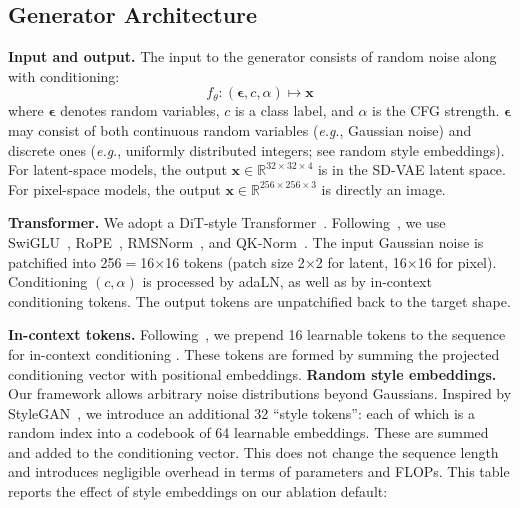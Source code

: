 \documentclass{article}
\newcommand{\vv}[1]{\mathbf{#1}}
\newcommand{\x}{\vv{x}}
\newcommand{\e}{{\boldsymbol{\epsilon}}}
\renewcommand{\paragraph}[1]{\vspace{.05em}\noindent\textbf{#1}}
\def\onedot{.}
\def\eg{\emph{e.g}\onedot} \def\Eg{\emph{E.g}\onedot}
\theoremstyle{plain}
\theoremstyle{definition}
\theoremstyle{remark}
\begin{document}
\subsection{Generator Architecture}
\label{sec:appendix_generator}

\paragraph{Input and output.}
The input to the generator consists of random noise along with conditioning:
\[
f_\theta: (\e, c, \alpha) \mapsto \x
\]
where $\e$ denotes random variables, $c$ is a class label, and $\alpha$ is the CFG strength.
$\e$ may consist of both continuous random variables (\eg, Gaussian noise) and discrete ones (\eg, uniformly distributed integers; see random style embeddings).
For latent-space models, the output $\mathbf{x} \in \mathbb{R}^{32\times 32\times 4}$ is in the SD-VAE latent space.
For pixel-space models, the output $\mathbf{x} \in \mathbb{R}^{256\times 256\times 3}$ is directly an image.

\paragraph{Transformer.}
We adopt a DiT-style Transformer~\citep{peebles2023scalable}. Following~\citep{yao2025reconstruction}, we use SwiGLU~\citep{shazeer2020glu}, RoPE~\citep{su2024roformer}, RMSNorm~\citep{zhang2019root}, and QK-Norm~\citep{henry2020query}.
The input Gaussian noise is patchified into 256$=$16$\times$16 tokens (patch size 2$\times$2 for latent, 16$\times$16 for pixel).
Conditioning $(c, \alpha)$ is processed by adaLN, as well as by in-context conditioning tokens.
The output tokens are unpatchified back to the target shape.

\paragraph{In-context tokens.}
Following~\cite{li2025back}, we prepend 16 learnable tokens to the sequence for in-context conditioning \cite{peebles2023scalable}.
These tokens are formed by summing the projected conditioning vector with positional embeddings.
\paragraph{Random style embeddings.}
Our framework allows arbitrary noise distributions beyond Gaussians.
Inspired by StyleGAN~\cite{sauer2022stylegan}, we introduce an additional 32 ``style tokens'': each of which is a random index into a codebook of 64 learnable embeddings.
These are summed and added to the conditioning vector.
This does not change the sequence length and introduces negligible overhead in terms of parameters and FLOPs. This table reports the effect of style embeddings on our ablation default:
\end{document}
